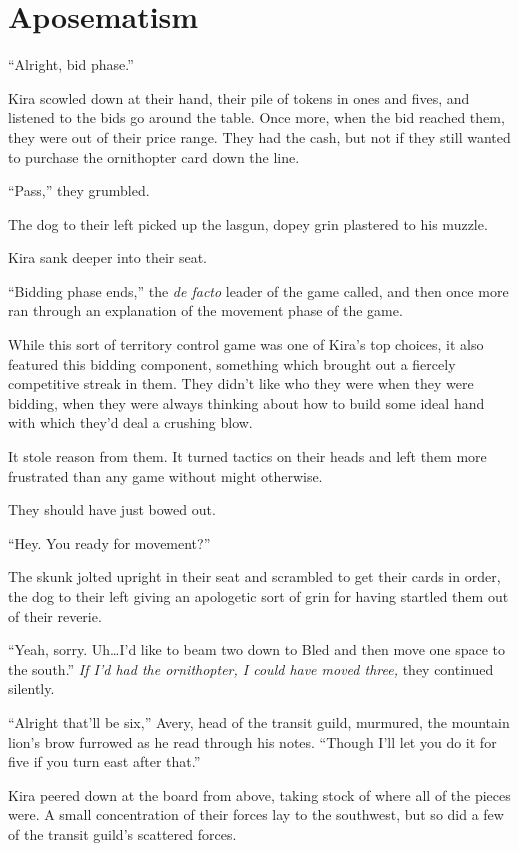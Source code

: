 \chapter{Aposematism}

``Alright, bid phase.''

Kira scowled down at their hand, their pile of tokens in ones and fives, and listened to the bids go around the table. Once more, when the bid reached them, they were out of their price range. They had the cash, but not if they still wanted to purchase the ornithopter card down the line.

``Pass,'' they grumbled.

The dog to their left picked up the lasgun, dopey grin plastered to his muzzle.

Kira sank deeper into their seat.

``Bidding phase ends,'' the \emph{de facto} leader of the game called, and then once more ran through an explanation of the movement phase of the game.

While this sort of territory control game was one of Kira's top choices, it also featured this bidding component, something which brought out a fiercely competitive streak in them. They didn't like who they were when they were bidding, when they were always thinking about how to build some ideal hand with which they'd deal a crushing blow.

It stole reason from them. It turned tactics on their heads and left them more frustrated than any game without might otherwise.

They should have just bowed out.

``Hey. You ready for movement?''

The skunk jolted upright in their seat and scrambled to get their cards in order, the dog to their left giving an apologetic sort of grin for having startled them out of their reverie.

``Yeah, sorry. Uh\ldots I'd like to beam two down to Bled and then move one space to the south.'' \emph{If I'd had the ornithopter, I could have moved three,} they continued silently.

``Alright that'll be six,'' Avery, head of the transit guild, murmured, the mountain lion's brow furrowed as he read through his notes. ``Though I'll let you do it for five if you turn east after that.''

Kira peered down at the board from above, taking stock of where all of the pieces were. A small concentration of their forces lay to the southwest, but so did a few of the transit guild's scattered forces.

